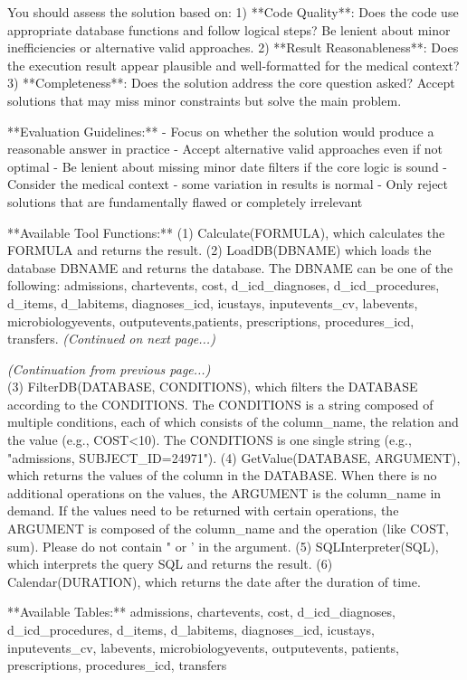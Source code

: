 \documentclass[11pt]{article}
\theoremstyle{plain}
\theoremstyle{definition}
\begin{document}
{\begin{tcolorbox}[systembox]
You should assess the solution based on:
1) **Code Quality**: Does the code use appropriate database functions and follow logical steps? Be lenient about minor inefficiencies or alternative valid approaches.
2) **Result Reasonableness**: Does the execution result appear plausible and well-formatted for the medical context?
3) **Completeness**: Does the solution address the core question asked? Accept solutions that may miss minor constraints but solve the main problem.

**Evaluation Guidelines:**
- Focus on whether the solution would produce a reasonable answer in practice
- Accept alternative valid approaches even if not optimal
- Be lenient about missing minor date filters if the core logic is sound
- Consider the medical context - some variation in results is normal
- Only reject solutions that are fundamentally flawed or completely irrelevant

**Available Tool Functions:**
(1) Calculate(FORMULA), which calculates the FORMULA and returns the result.
(2) LoadDB(DBNAME) which loads the database DBNAME and returns the database. The DBNAME can be one of the following: admissions, chartevents, cost, d\_icd\_diagnoses, d\_icd\_procedures, d\_items, d\_labitems, diagnoses\_icd, icustays, inputevents\_cv, labevents, microbiologyevents, outputevents,patients, prescriptions, procedures\_icd, transfers.
\textit{(Continued on next page...)}
\end{tcolorbox}

\begin{tcolorbox}[systembox]
\textit{(Continuation from previous page...)}\\
(3) FilterDB(DATABASE, CONDITIONS), which filters the DATABASE according to the CONDITIONS. The CONDITIONS is a string composed of multiple conditions, each of which consists of the column\_name, the relation and the value (e.g., COST<10). The CONDITIONS is one single string (e.g., "admissions, SUBJECT\_ID=24971").
(4) GetValue(DATABASE, ARGUMENT), which returns the values of the column in the DATABASE. When there is no additional operations on the values, the ARGUMENT is the column\_name in demand. If the values need to be returned with certain operations, the ARGUMENT is composed of the column\_name and the operation (like COST, sum). Please do not contain " or ' in the argument.
(5) SQLInterpreter(SQL), which interprets the query SQL and returns the result.
(6) Calendar(DURATION), which returns the date after the duration of time.

**Available Tables:**
admissions, chartevents, cost, d\_icd\_diagnoses, d\_icd\_procedures, d\_items, d\_labitems, diagnoses\_icd, icustays, inputevents\_cv, labevents, microbiologyevents, outputevents, patients, prescriptions, procedures\_icd, transfers


\end{tcolorbox}}
\end{document}

